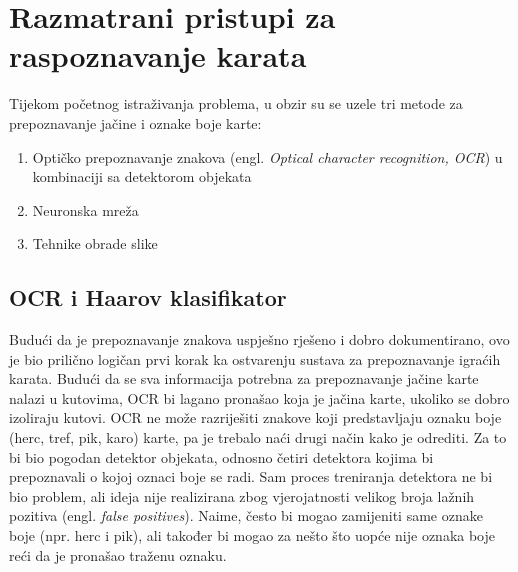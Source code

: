 \documentclass[times, zavrsni, numeric, utf8]{fer}
\begin{document}
\chapter{Razmatrani pristupi za raspoznavanje karata}
\label{chap:methods}
\hspace*{0.5cm}Tijekom početnog istraživanja problema, u obzir su se uzele tri metode za prepoznavanje jačine i oznake boje karte:
\begin{enumerate}
\item Optičko prepoznavanje znakova (engl. \textit{Optical character recognition, OCR}) u kombinaciji sa detektorom objekata
\item Neuronska mreža
\item Tehnike obrade slike
\end{enumerate}

\section{OCR i Haarov klasifikator}
\hspace*{0.5cm}Budući da je prepoznavanje znakova uspješno rješeno i dobro dokumentirano, ovo je bio prilično logičan prvi korak ka ostvarenju sustava za prepoznavanje igraćih karata. Budući da se sva informacija potrebna za prepoznavanje jačine karte nalazi u kutovima, OCR bi lagano pronašao koja je jačina karte, ukoliko se dobro izoliraju kutovi. OCR ne može razriješiti znakove koji predstavljaju oznaku boje (herc, tref, pik, karo) karte, pa je trebalo naći drugi način kako je odrediti. Za to bi bio pogodan detektor objekata, odnosno četiri detektora kojima bi prepoznavali o kojoj oznaci boje se radi. Sam proces treniranja detektora ne bi bio problem, ali ideja nije realizirana zbog vjerojatnosti velikog broja lažnih pozitiva (engl. \textit{false positives}). Naime, često bi mogao zamijeniti same oznake boje (npr. herc i pik), ali također bi mogao za nešto što uopće nije oznaka boje reći da je pronašao traženu oznaku. 
\end{document}
